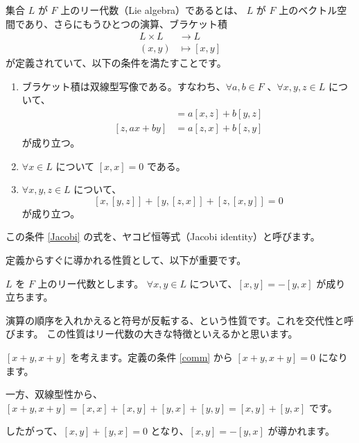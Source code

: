 \documentclass{ltjsarticle}
\begin{document}
\begin{usmdefinition}[リー代数]
    集合 \(L\) が \(F\) 上のリー代数（Lie algebra）であるとは、
    \(L\) が \(F\) 上のベクトル空間であり、さらにもうひとつの演算、ブラケット積
    \begin{align*}
        L \times L & \to L          \\
        (x, y)     & \mapsto [x, y]
    \end{align*}
    が定義されていて、以下の条件を満たすことです。
    \begin{enumerate}
        \item ブラケット積は双線型写像である。すなわち、\(\forall a, b \in F\) 、\(\forall x, y, z \in L\) について、
              \begin{align*}
                  [ax + by, z] & = a[x, z] + b[y, z] \\
                  [z, ax + by] & = a[z, x] + b[z, y]
              \end{align*}
              が成り立つ。
        \item\label{comm} \(\forall x \in L\) について \([x, x] = 0\) である。
        \item\label{Jacobi} \(\forall x, y, z \in L\) について、
              \[
                  [x, [y, z]] + [y, [z, x]] + [z, [x, y]] = 0
              \]
              が成り立つ。
    \end{enumerate}
\end{usmdefinition}

この条件 \ref{Jacobi} の式を、ヤコビ恒等式（Jacobi identity）と呼びます。

定義からすぐに導かれる性質として、以下が重要です。

\begin{usmproposition}[交代性]
    \(L\) を \(F\) 上のリー代数とします。
    \(\forall x, y\in L\) について、\([x, y] = -[y, x]\) が成り立ちます。
\end{usmproposition}

演算の順序を入れかえると符号が反転する、という性質です。これを交代性と呼びます。
この性質はリー代数の大きな特徴といえるかと思います。

\begin{usmproof}
    \([x + y, x + y]\) を考えます。定義の条件 \ref{comm} から \([x + y, x + y] = 0\) になります。

    一方、双線型性から、\([x + y, x + y] = [x, x] + [x, y] + [y, x] + [y, y] = [x, y] + [y, x]\) です。

    したがって、\([x, y] + [y, x] = 0\) となり、\([x, y] = -[y, x]\) が導かれます。
\end{usmproof}
\end{document}
